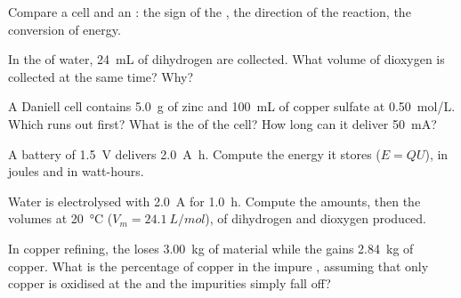 \begin{exercise}[$\star\star$]\label{exo:g12:cells-and-electrolysis:10}
Compare a cell and an : the sign of the , the direction
of the reaction, the conversion of energy.
\end{exercise}

\begin{exercise}[$\star\star$]\label{exo:g12:cells-and-electrolysis:11}
In the  of water, \qty{24}{mL} of dihydrogen are collected.
What volume of dioxygen is collected at the same time? Why?
\end{exercise}

\begin{exercise}[$\star\star\star$]\label{exo:g12:cells-and-electrolysis:12}
A Daniell cell contains \qty{5.0}{g} of zinc and \qty{100}{mL} of copper
sulfate at \qty{0.50}{mol/L}. Which  runs out first? What is the
 of the cell? How long can it deliver \qty{50}{mA}?
\end{exercise}

\begin{exercise}[$\star\star\star$]\label{exo:g12:cells-and-electrolysis:13}
A battery of \qty{1.5}{V} delivers \qty{2.0}{A.h}. Compute the energy it
stores ($E = Q U$), in joules and in watt-hours.
\end{exercise}

\begin{exercise}[$\star\star\star$]\label{exo:g12:cells-and-electrolysis:14}
Water is electrolysed with \qty{2.0}{A} for \qty{1.0}{h}. Compute the
amounts, then the volumes at \qty{20}{\celsius} ($V_m = \qty{24.1}{L/mol}$),
of dihydrogen and dioxygen produced.
\end{exercise}

\begin{exercise}[$\star\star\star$]\label{exo:g12:cells-and-electrolysis:15}
In copper refining, the  loses \qty{3.00}{kg} of material while the
 gains \qty{2.84}{kg} of copper. What is the percentage of copper
in the impure , assuming that only copper is oxidised at the 
and the impurities simply fall off?
\end{exercise}

